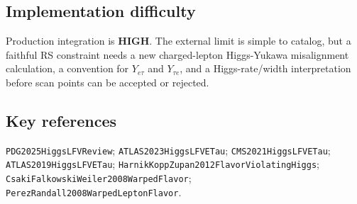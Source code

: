 \subsection*{Implementation difficulty}
Production integration is \textbf{HIGH}.  The external limit is simple to
catalog, but a faithful RS constraint needs a new charged-lepton Higgs-Yukawa
misalignment calculation, a convention for \(Y_{e\tau}\) and \(Y_{\tau e}\),
and a Higgs-rate/width interpretation before scan points can be accepted or
rejected.

\subsection*{Key references}
\texttt{PDG2025HiggsLFVReview}; \texttt{ATLAS2023HiggsLFVETau};
\texttt{CMS2021HiggsLFVETau}; \texttt{ATLAS2019HiggsLFVETau};
\texttt{HarnikKoppZupan2012FlavorViolatingHiggs};
\texttt{CsakiFalkowskiWeiler2008WarpedFlavor};
\texttt{PerezRandall2008WarpedLeptonFlavor}.

